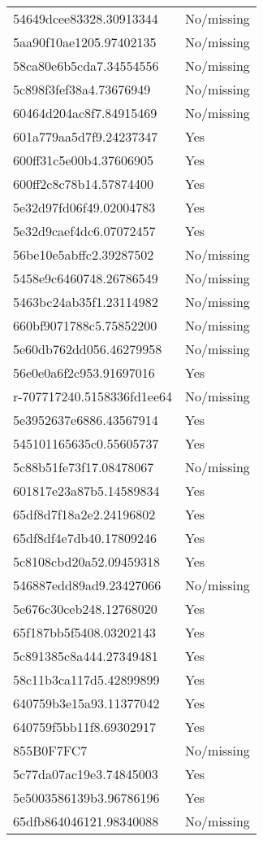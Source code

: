 \begin{tabular}{ll}
54649dcee83328.30913344 & No/missing \\
5aa90f10ae1205.97402135 & No/missing \\
58ca80e6b5cda7.34554556 & No/missing \\
5c898f3fef38a4.73676949 & No/missing \\
60464d204ac8f7.84915469 & No/missing \\
601a779aa5d7f9.24237347 & Yes \\
600ff31c5e00b4.37606905 & Yes \\
600ff2c8c78b14.57874400 & Yes \\
5e32d97fd06f49.02004783 & Yes \\
5e32d9caef4dc6.07072457 & Yes \\
56be10e5abffc2.39287502 & No/missing \\
5458e9c6460748.26786549 & No/missing \\
5463bc24ab35f1.23114982 & No/missing \\
660bf9071788c5.75852200 & No/missing \\
5e60db762dd056.46279958 & No/missing \\
56e0e0a6f2c953.91697016 & Yes \\
r-707717240.5158336fd1ee64 & No/missing \\
5e3952637e6886.43567914 & Yes \\
545101165635c0.55605737 & Yes \\
5c88b51fe73f17.08478067 & No/missing \\
601817e23a87b5.14589834 & Yes \\
65df8d7f18a2e2.24196802 & Yes \\
65df8df4e7db40.17809246 & Yes \\
5c8108cbd20a52.09459318 & Yes \\
546887edd89ad9.23427066 & No/missing \\
5e676c30ceb248.12768020 & Yes \\
65f187bb5f5408.03202143 & Yes \\
5c891385c8a444.27349481 & Yes \\
58c11b3ca117d5.42899899 & Yes \\
640759b3e15a93.11377042 & Yes \\
640759f5bb11f8.69302917 & Yes \\
855B0F7FC7 & No/missing \\
5c77da07ac19e3.74845003 & Yes \\
5e5003586139b3.96786196 & Yes \\
65dfb864046121.98340088 & No/missing \\

\end{tabular}
